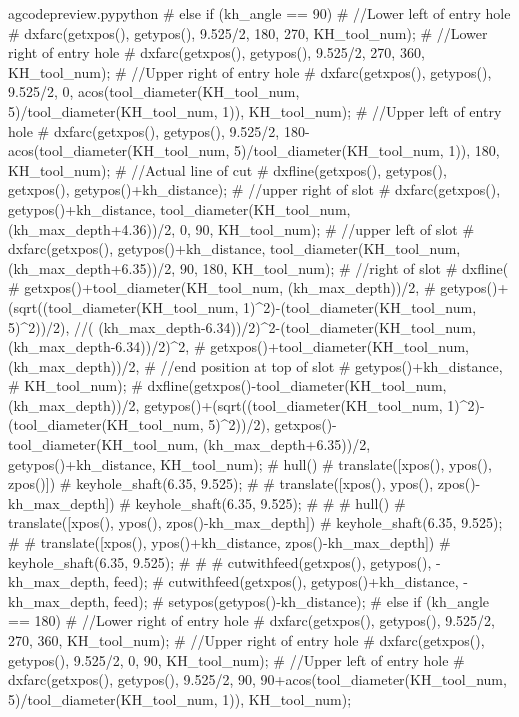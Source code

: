 \documentclass{ltxdoc}
\begin{document}
\begin{writecode}{a}{gcodepreview.py}{python}
{#  } else if (kh_angle == 90) {
#    //Lower left of entry hole
#    dxfarc(getxpos(), getypos(), 9.525/2, 180, 270, KH_tool_num);
#    //Lower right of entry hole
#    dxfarc(getxpos(), getypos(), 9.525/2, 270, 360, KH_tool_num);
#    //Upper right of entry hole
#    dxfarc(getxpos(), getypos(), 9.525/2, 0, acos(tool_diameter(KH_tool_num, 5)/tool_diameter(KH_tool_num, 1)), KH_tool_num);
#    //Upper left of entry hole
#    dxfarc(getxpos(), getypos(), 9.525/2, 180-acos(tool_diameter(KH_tool_num, 5)/tool_diameter(KH_tool_num, 1)), 180, KH_tool_num);
#    //Actual line of cut
#    dxfline(getxpos(), getypos(), getxpos(), getypos()+kh_distance);
#    //upper right of slot
#    dxfarc(getxpos(), getypos()+kh_distance, tool_diameter(KH_tool_num, (kh_max_depth+4.36))/2, 0, 90, KH_tool_num);
#    //upper left of slot
#    dxfarc(getxpos(), getypos()+kh_distance, tool_diameter(KH_tool_num, (kh_max_depth+6.35))/2, 90, 180, KH_tool_num);
#    //right of slot
#    dxfline(
#        getxpos()+tool_diameter(KH_tool_num, (kh_max_depth))/2, 
#        getypos()+(sqrt((tool_diameter(KH_tool_num, 1)^2)-(tool_diameter(KH_tool_num, 5)^2))/2), //( (kh_max_depth-6.34))/2)^2-(tool_diameter(KH_tool_num, (kh_max_depth-6.34))/2)^2, 
#        getxpos()+tool_diameter(KH_tool_num, (kh_max_depth))/2, 
#    //end position at top of slot
#        getypos()+kh_distance, 
#        KH_tool_num);
#    dxfline(getxpos()-tool_diameter(KH_tool_num, (kh_max_depth))/2, getypos()+(sqrt((tool_diameter(KH_tool_num, 1)^2)-(tool_diameter(KH_tool_num, 5)^2))/2), getxpos()-tool_diameter(KH_tool_num, (kh_max_depth+6.35))/2, getypos()+kh_distance, KH_tool_num);
#    hull(){
#      translate([xpos(), ypos(), zpos()]){
#        keyhole_shaft(6.35, 9.525);
#      }
#      translate([xpos(), ypos(), zpos()-kh_max_depth]){
#        keyhole_shaft(6.35, 9.525);
#      }
#    }
#    hull(){
#      translate([xpos(), ypos(), zpos()-kh_max_depth]){
#        keyhole_shaft(6.35, 9.525);
#      }
#      translate([xpos(), ypos()+kh_distance, zpos()-kh_max_depth]){
#        keyhole_shaft(6.35, 9.525);
#      }
#    }
#    cutwithfeed(getxpos(), getypos(), -kh_max_depth, feed);
#    cutwithfeed(getxpos(), getypos()+kh_distance, -kh_max_depth, feed);
#    setypos(getypos()-kh_distance);
#  } else if (kh_angle == 180) {
#    //Lower right of entry hole
#    dxfarc(getxpos(), getypos(), 9.525/2, 270, 360, KH_tool_num);
#    //Upper right of entry hole
#    dxfarc(getxpos(), getypos(), 9.525/2, 0, 90, KH_tool_num);
#    //Upper left of entry hole
#    dxfarc(getxpos(), getypos(), 9.525/2, 90, 90+acos(tool_diameter(KH_tool_num, 5)/tool_diameter(KH_tool_num, 1)), KH_tool_num);
}
\end{writecode}
\end{document}
